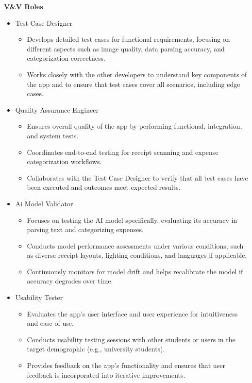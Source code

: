 \documentclass[12pt, titlepage]{article}
\begin{document}
\noindent \textbf{V\&V Roles}
\begin{itemize}
	\item Test Case Designer
	\begin{itemize}
		\item Develops detailed test cases for functional requirements, focusing on different aspects such as image quality, data parsing accuracy, and categorization correctness.
		\item Works closely with the other developers to understand key components of the app and to ensure that test cases cover all scenarios, including edge cases.
	\end{itemize}
	\item Quality Assurance Engineer
	\begin{itemize}
		\item Ensures overall quality of the app by performing functional, integration, and system tests.
		\item Coordinates end-to-end testing for receipt scanning and expense categorization workflows.
		\item Collaborates with the Test Case Designer to verify that all test cases have been executed and outcomes meet expected results.
	\end{itemize}
	\item Ai Model Validator
	\begin{itemize}
		\item Focuses on testing the AI model specifically, evaluating its accuracy in parsing text and categorizing expenses.
		\item Conducts model performance assessments under various conditions, such as diverse receipt layouts, lighting conditions, and languages if applicable.
		\item Continuously monitors for model drift and helps recalibrate the model if accuracy degrades over time.
	\end{itemize}
	\item Usability Tester
	\begin{itemize}
		\item Evaluates the app's user interface and user experience for intuitiveness and ease of use.
		\item Conducts usability testing sessions with other students or users in the target demographic (e.g., university students).
		\item Provides feedback on the app's functionality and ensures that user feedback is incorporated into iterative improvements.
	\end{itemize}

\end{itemize}
\end{document}
